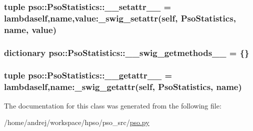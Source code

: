 \hypertarget{classpso_1_1PsoStatistics_ef4a87e97575cced9c7cf46cec7347f3}{
\subsubsection{\setlength{\rightskip}{0pt plus 5cm}tuple {\bf pso::PsoStatistics::\_\-\_\-setattr\_\-\_\-} = lambdaself,name,value:\_\-swig\_\-setattr(self, {\bf PsoStatistics}, name, value)}}
\label{classpso_1_1PsoStatistics_ef4a87e97575cced9c7cf46cec7347f3}


\hypertarget{classpso_1_1PsoStatistics_9ae2c84553e36e6d46105a044143b2b1}{
\subsubsection{\setlength{\rightskip}{0pt plus 5cm}dictionary {\bf pso::PsoStatistics::\_\-\_\-swig\_\-getmethods\_\-\_\-} = \{\}}}
\label{classpso_1_1PsoStatistics_9ae2c84553e36e6d46105a044143b2b1}


\hypertarget{classpso_1_1PsoStatistics_bcd79851d7b784545f23df27242e8811}{
\subsubsection{\setlength{\rightskip}{0pt plus 5cm}tuple {\bf pso::PsoStatistics::\_\-\_\-getattr\_\-\_\-} = lambdaself,name:\_\-swig\_\-getattr(self, {\bf PsoStatistics}, name)}}
\label{classpso_1_1PsoStatistics_bcd79851d7b784545f23df27242e8811}




The documentation for this class was generated from the following file:\begin{CompactItemize}
\item 
/home/andrej/workspace/hpso/pso\_\-src/\hyperlink{pso_8py}{pso.py}\end{CompactItemize}
